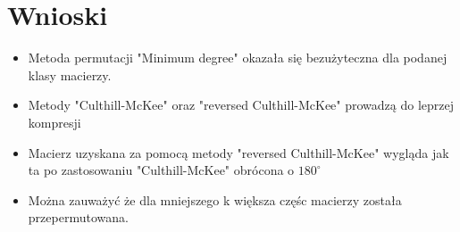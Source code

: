 \documentclass{article}
\begin{document}
\section{Wnioski}
\begin{itemize}
  \item Metoda permutacji "Minimum degree" okazała się bezużyteczna dla podanej klasy macierzy.
  \item Metody "Culthill-McKee" oraz "reversed Culthill-McKee" prowadzą do leprzej kompresji
  \item Macierz uzyskana za pomocą metody "reversed Culthill-McKee" wygląda jak ta po zastosowaniu "Culthill-McKee" obrócona o $180^{\circ}$
  \item Można zauważyć że dla mniejszego k większa częśc macierzy została przepermutowana.
\end{itemize}
\end{document}
